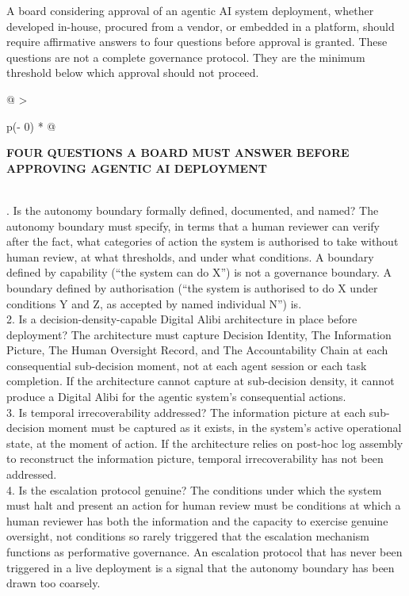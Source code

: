 A board considering approval of an agentic AI system deployment, whether developed in-house, procured from a vendor, or embedded in a platform, should require affirmative answers to four questions before approval is granted. These questions are not a complete governance protocol. They are the minimum threshold below which approval should not proceed.

\begin{longtable}[]{@{}
  >{\raggedright\arraybackslash}p{(\columnwidth - 0\tabcolsep) * }@{}}
\toprule\noalign{}
\begin{minipage}[b]{\linewidth}\raggedright
\textbf{FOUR QUESTIONS A BOARD MUST ANSWER BEFORE APPROVING AGENTIC AI DEPLOYMENT}
\end{minipage} \\
\midrule\noalign{}
\endhead
\bottomrule\noalign{}
. Is the autonomy boundary formally defined, documented, and named? The autonomy boundary must specify, in terms that a human reviewer can verify after the fact, what categories of action the system is authorised to take without human review, at what thresholds, and under what conditions. A boundary defined by capability (``the system can do X'') is not a governance boundary. A boundary defined by authorisation (``the system is authorised to do X under conditions Y and Z, as accepted by named individual N'') is. \\
2. Is a decision-density-capable Digital Alibi architecture in place before deployment? The architecture must capture Decision Identity, The Information Picture, The Human Oversight Record, and The Accountability Chain at each consequential sub-decision moment, not at each agent session or each task completion. If the architecture cannot capture at sub-decision density, it cannot produce a Digital Alibi for the agentic system's consequential actions. \\
3. Is temporal irrecoverability addressed? The information picture at each sub-decision moment must be captured as it exists, in the system's active operational state, at the moment of action. If the architecture relies on post-hoc log assembly to reconstruct the information picture, temporal irrecoverability has not been addressed. \\
4. Is the escalation protocol genuine? The conditions under which the system must halt and present an action for human review must be conditions at which a human reviewer has both the information and the capacity to exercise genuine oversight, not conditions so rarely triggered that the escalation mechanism functions as performative governance. An escalation protocol that has never been triggered in a live deployment is a signal that the autonomy boundary has been drawn too coarsely. \\
\end{longtable}

